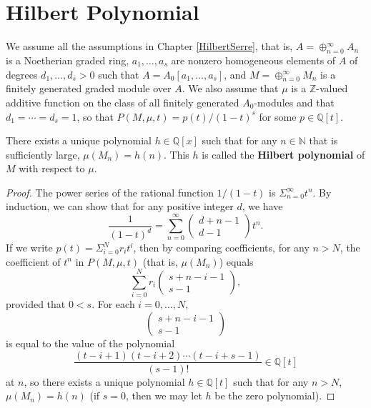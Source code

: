 \chapter{Hilbert Polynomial}

We assume all the assumptions in Chapter \ref{HilbertSerre}, that is, $A=\oplus_{n=0}^{\infty}{A}_n$ is a Noetherian graded ring, $a_1,\ldots,a_s$ are nonzero homogeneous elements of $A$ of degrees $d_1,\ldots,d_s>0$ such that $A=A_0[a_1,\ldots,a_s]$, and $M=\oplus_{n=0}^{\infty}M_n$ is a finitely generated graded module over $A$. We also assume that $\mu$ is a $\mathbb{Z}$-valued additive function on the class of all finitely generated $A_0$-modules and that $d_1=\cdots=d_s=1$, so that $P(M,\mu,t)=p(t)/(1-t)^s$ for some $p\in\mathbb{Q}[t]$.

\begin{theorem}
\label{Hilpoly}
\leanok
There exists a unique polynomial $h{\in}\mathbb{Q}[x]$ such that for any $n\in\mathbb{N}$ that is sufficiently large, $\mu(M_n)=h(n)$. This $h$ is called the \textbf{Hilbert polynomial} of $M$ with respect to $\mu$.
\end{theorem}
\begin{proof}
The power series of the rational function $1/(1-t)$ is $\Sigma_{n=0}^{\infty}t^n$. By induction, we can show that for any positive integer $d$, we have
\begin{equation}
\frac{1}{(1-t)^d}=\sum_{n=0}^{\infty}
\left(
\begin{array}{c}
d+n-1 \\
d-1
\end{array}\right)
t^n.
\end{equation}
If we write $p(t)=\Sigma_{i=0}^{N}r_i{t^i}$, then by comparing coefficients, for any $n>{N}$, the coefficient of $t^n$ in $P(M,\mu,t)$ (that is, $\mu(M_n)$) equals
\begin{equation}
\sum_{i=0}^N{r_i}
\left(
\begin{array}{c}
s+n-i-1 \\
s-1
\end{array}\right),
\end{equation}
provided that $0<s$. For each $i=0,\ldots,N$,
\begin{equation}
\left(
\begin{array}{c}
s+n-i-1 \\
s-1
\end{array}\right)
\end{equation}
is equal to the value of the polynomial
\begin{equation}
\frac{(t-i+1)(t-i+2)\cdots(t-i+s-1)}{(s-1)!}\in\mathbb{Q}[t]
\end{equation}
at $n$, so there exists a unique polynomial $h\in\mathbb{Q}[t]$ such that for any $n>{N}$, $\mu(M_n)=h(n)$ (if $s=0$, then we may let $h$ be the zero polynomial).
\end{proof}

